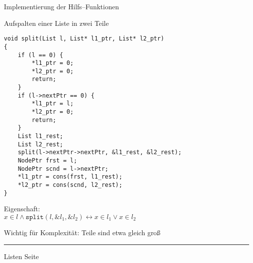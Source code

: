 \begin{slide}{}
\normalsize

\begin{center}
Implementierung der Hilfs--Funktionen
\end{center}
\vspace*{0.5cm}

\footnotesize
Aufspalten einer Liste in zwei Teile
\begin{verbatim}
void split(List l, List* l1_ptr, List* l2_ptr)
{
    if (l == 0) {
        *l1_ptr = 0;
        *l2_ptr = 0;
        return;
    }
    if (l->nextPtr == 0) {
        *l1_ptr = l;
        *l2_ptr = 0;
        return;
    }
    List l1_rest;
    List l2_rest;
    split(l->nextPtr->nextPtr, &l1_rest, &l2_rest);
    NodePtr frst = l;
    NodePtr scnd = l->nextPtr;
    *l1_ptr = cons(frst, l1_rest);
    *l2_ptr = cons(scnd, l2_rest);
}
\end{verbatim}
Eigenschaft: \\[0.3cm]
\hspace*{1.3cm} $x\in l \wedge \mathtt{split}(l, \&l_1, \&l_2) \leftrightarrow x \in l_1 \vee x \in l_2$
 
Wichtig f\"ur Komplexit\"at: Teile sind etwa gleich gro{\ss} 

\vspace*{\fill}
\tiny \addtocounter{mypage}{1}
\rule{17cm}{1mm}
Listen  \hspace*{\fill} Seite 
\end{slide}


